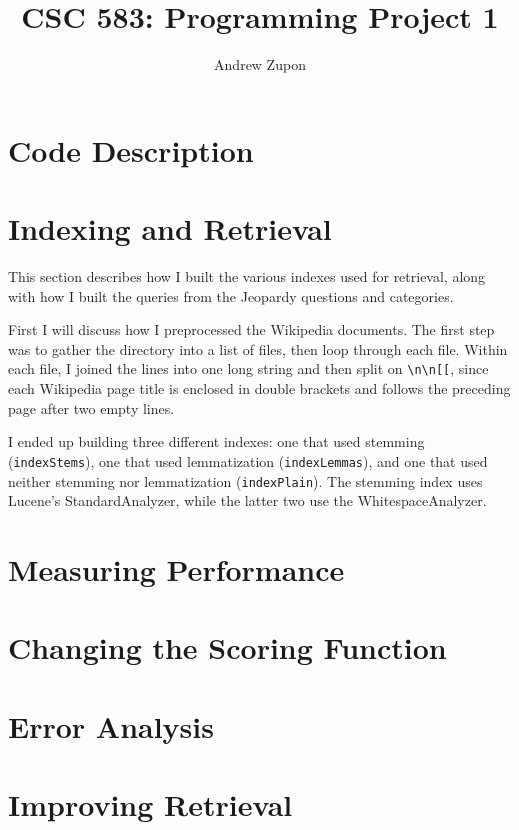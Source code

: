 \documentclass[11pt,letterpaper]{article}
\title{CSC 583: Programming Project 1}
\author{Andrew Zupon \\
}
\date{}
\begin{document}
	\maketitle
	

\section{Code Description}
	
	
\section{Indexing and Retrieval}
This section describes how I built the various indexes used for retrieval, along with how I built the queries from the Jeopardy questions and categories.

First I will discuss how I preprocessed the Wikipedia documents.
The first step was to gather the directory into a list of files, then loop through each file.
Within each file, I joined the lines into one long string and then split on \texttt{\textbackslash{}n\textbackslash{}n[[}, since each Wikipedia page title is enclosed in double brackets and follows the preceding page after two empty lines.



I ended up building three different indexes:  one that used stemming (\texttt{indexStems}), one that used lemmatization (\texttt{indexLemmas}), and one that used neither stemming nor lemmatization (\texttt{indexPlain}). The stemming index uses Lucene's StandardAnalyzer, while the latter two use the WhitespaceAnalyzer.



\section{Measuring Performance}



\section{Changing the Scoring Function}



\section{Error Analysis}



\section{Improving Retrieval}
\end{document}
